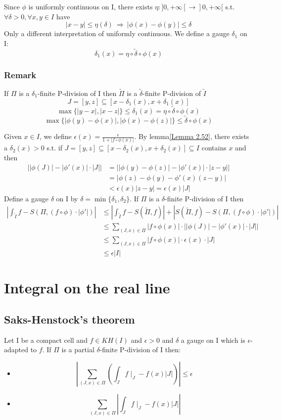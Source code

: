 \documentclass{book}
\newcommand{\abs}[1]{\left\lvert #1 \right\rvert}
\newcommand{\leftbracket}{[}
\newcommand{\rightbracket}{]}
\begin{document}
Since $\phi$ is uniformly continuous on I, there exists $\eta:\rightbracket0,+\infty\leftbracket\rightarrow\rightbracket0,+\infty\leftbracket$ s.t. $\forall\delta>0,\forall x,y\in I$ have $$\abs{x-y}\leq\eta(\delta)\ \Rightarrow\ \abs{\phi(x)-\phi(y)}\leq\delta$$
Only a different interpretation of uniformly continuous. We define a gauge $\delta_1$ on I:
$$\delta_1(x)=\eta\circ\tilde\delta\circ\phi(x)$$
\subsection*{Remark}
If $\Pi$ is a $\delta_1$-finite P-division of I then $\tilde\Pi$ is a $\tilde\delta$-finite P-division of $\tilde I$
$$J=[y,z]\subseteq[x-\delta_1(x),x+\delta_1(x)]$$
$$\max\{\abs{y-x},\abs{x-z}\}\leq \delta_1(x)=\eta\circ\tilde\delta\circ\phi(x)$$
$$\max\{\abs{\phi(y)-\phi(x)},\abs{\phi(x)-\phi(z)}\}\leq\tilde\delta\circ\phi(x)$$

Given $x\in I$, we define $\epsilon(x)=\frac{\epsilon}{1+\abs{f\circ\phi(x)}}$. By lemma\ref{Lemma 2.52}, there exists a $\delta_2(x)>0$ s.t. if $J=[y,z]\subseteq[x-\delta_2(x),x+\delta_2(x)]\subseteq I$ contains $x$ and then 
$$\begin{aligned}
    \abs{\abs{\phi(J)}-\abs{\phi'(x)}\cdot\abs J} &= \abs{\abs{\phi(y)-\phi(z)}-\abs{\phi'(x)}\cdot\abs{z-y}}\\
    &=\abs{\phi(z)-\phi(y)-\phi'(x)(z-y)}\\
    &<\epsilon(x)\abs{z-y}=\epsilon(x)\abs J
\end{aligned} $$
Define a gauge $\delta$ on I by $\delta=\min\{\delta_1,\delta_2\}$. If $\Pi $ is a $\delta$-finite P-division of I then 
$$\begin{aligned}
    \abs{\int_{\tilde I}f-S(\Pi,(f\circ\phi)\cdot\abs{\phi'})}&\leq\abs{\int_{\tilde I}f-S(\tilde\Pi,f)}+\abs{S(\tilde\Pi,f)-S(\Pi,(f\circ\phi)\cdot\abs{\phi'})}\\
    &\leq\sum\limits_{(J,x)\in \Pi}\abs{f\circ\phi(x)}\cdot\abs{\abs{\phi(J)}-\abs{\phi'(x)}\cdot\abs J}\\
    &\leq\sum\limits_{(J,x)\in \Pi}\abs{f\circ\phi(x)}\cdot\epsilon(x)\cdot\abs{J}\\
    &\leq \epsilon\abs I
\end{aligned}$$
\chapter{Integral on the real line}
\section{Saks-Henstock's theorem}
\label{Saks-Henstock's theorem}
Let I be a compact cell and $f\in KH(I)$ and $\epsilon>0$ and $\delta$ a gauge on I which is $\epsilon$-adapted to $f$. If $\Pi$ is a partial $\delta$-finite P-division of I then:
\begin{itemize}
    \item $$\abs{\sum\limits_{(J,x)\in \Pi}\left(\int_Jf\mid_J-f(x)\abs J\right)}\leq\epsilon$$
    \item $$\sum\limits_{(J,x)\in \Pi}\abs{\int_Jf\mid_J-f(x)\abs J}$$
\end{itemize}
\end{document}
